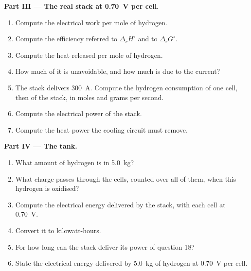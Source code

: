 \begin{problem}
\medskip
\noindent\textbf{Part III --- The real stack at \qty{0.70}{V} per cell.}
\begin{enumerate}[resume]
  \item Compute the electrical work per mole of hydrogen.
  \item Compute the efficiency referred to $\Delta_r H^\circ$ and to $\Delta_r G^\circ$.
  \item Compute the heat released per mole of hydrogen.
  \item How much of it is unavoidable, and how much is due to the current?
  \item The stack delivers \qty{300}{A}. Compute the hydrogen consumption of one
        cell, then of the stack, in moles and grams per second.
  \item Compute the electrical power of the stack.
  \item Compute the heat power the cooling circuit must remove.
\end{enumerate}

\medskip
\noindent\textbf{Part IV --- The tank.}
\begin{enumerate}[resume]
  \item What amount of hydrogen is in \qty{5.0}{kg}?
  \item What charge passes through the cells, counted over all of them, when
        this hydrogen is oxidised?
  \item Compute the electrical energy delivered by the stack, with each cell at
        \qty{0.70}{V}.
  \item Convert it to kilowatt-hours.
  \item For how long can the stack deliver its power of question 18?
  \item State the electrical energy delivered by \qty{5.0}{kg} of hydrogen at
        \qty{0.70}{V} per cell.
\end{enumerate}
\end{problem}
